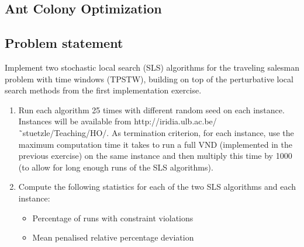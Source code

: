 
\newpage
\begin{homeworkProblem}
\section{Ant Colony Optimization}
\subsection{Problem statement}
Implement two stochastic local search (SLS) algorithms for the traveling salesman problem with time windows (TPSTW), building on top of the perturbative local search methods from the first implementation exercise.
\begin{enumerate}
  \item Run each algorithm 25 times with different random seed on each instance. Instances will be available from http://iridia.ulb.ac.be/˜stuetzle/Teaching/HO/. As termination criterion, for each instance, use the maximum computation time it takes to run a full VND (implemented in the previous exercise) on the same instance and then multiply this time by 1000 (to allow for long enough runs of the SLS algorithms).
 \item Compute the following statistics for each of the two SLS algorithms and each instance:
 \begin{itemize}
   \item Percentage of runs with constraint violations
   \item Mean penalised relative percentage deviation
 \end{itemize}


\end{enumerate}
\end{homeworkProblem}
